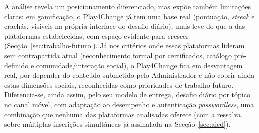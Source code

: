 A análise revela um posicionamento diferenciado, mas expõe também limitações claras: em gamificação, o Play4Change já tem uma base real (pontuação, \textit{streak} e crachás, visíveis na própria interface do desafio diário), mais leve do que a das plataformas estabelecidas, com espaço evidente para crescer (Secção~\ref{sec:trabalho-futuro}). Já nos critérios onde essas plataformas lideram sem contrapartida atual (reconhecimento formal por certificados, catálogo pré-definido e comunidade/interação social), o Play4Change fica em desvantagem real, por depender do conteúdo submetido pelo Administrador e não cobrir ainda estas dimensões sociais, reconhecidas como prioridades de trabalho futuro. Diferencia-se, ainda assim, pelo seu modelo de entrega, desafio diário por tópico no canal móvel, com adaptação ao desempenho e autenticação \textit{passwordless}, uma combinação que nenhuma das plataformas analisadas oferece (com a ressalva sobre múltiplas inscrições simultâneas já assinalada na Secção~\ref{sec:aied}).
